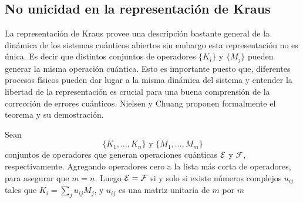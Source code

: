 \subsection{No unicidad en la representación de Kraus} %
 La representación de Kraus provee una descripción bastante general de la dinámica de los sistemas cuánticos abiertos sin embargo esta representación no es única. Es decir que distintos conjuntos de operadores $\{K_i\}$ y $\{M_j\}$ pueden generar la misma operación cuántica. Esto es importante puesto que, diferentes procesos físicos pueden dar lugar a la misma dinámica del sistema y entender la libertad de la representación es crucial para una buena comprensión de la corrección de errores cuánticos. Nielsen y Chuang {\cite{nielsen_chuang_2010}} proponen formalmente el teorema y su demostración.


 \begin{theorem}\label{Libertad_unitaria}
    
    Sean \[\{K_1,\ldots,K_n\} \text{ y } \{M_1,\ldots , M_m\}\] conjuntos de operadores que generan operaciones cuánticas $\mathcal{E}$ y $\mathcal{F}$, respectivamente. Agregando operadores cero a la lista más corta de operadores, para asegurar que $m=n$. Luego $\mathcal{E}=\mathcal{F}$ si y solo si existe números complejos $u_{ij}$ tales que $K_i=\sum_j u_{ij}M_j$, y $u_{ij}$ es una matriz unitaria de $m$ por $m$
    
 \end{theorem}

